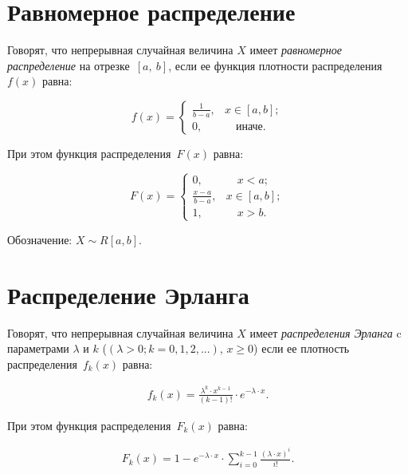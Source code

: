 
\chapter{Равномерное распределение}

Говорят, что непрерывная случайная величина $X$ имеет \textit{равномерное распределение} на отрезке~$[a,~b]$, если ее функция плотности распределения~$f(x)$ равна:

\begin{equation}
	f(x) =
	\begin{cases}
		\displaystyle\frac{1}{b - a}, & x \in [a, b];\\
		0,  & \quad \text{иначе}.
	\end{cases}
\end{equation}

При этом функция распределения~$F(x)$ равна:

\begin{equation}
	F(x) =
	\begin{cases}
		0,  & \quad x < a;\\
		\displaystyle\frac{x - a}{b - a}, & x \in [a, b];\\
		1,  & \quad x > b.
	\end{cases}
\end{equation}

Обозначение: $X \sim R[a, b]$.

\chapter{Распределение Эрланга} %

Говорят, что непрерывная случайная величина $X$ имеет \textit{распределения Эрланга} c параметрами $\lambda$ и $k$ ($(\lambda > 0; k = 0, 1, 2, ...)$, $x \geqslant 0$) если ее плотность распределения~$f_k(x)$ равна:

\begin{equation}
	\begin{aligned}
		f_k(x) = \frac{\lambda^{k} \cdot x^{k-1}}{(k-1)!} \cdot e^{-\lambda \cdot x}.
	\end{aligned}
\end{equation}

При этом функция распределения~$F_k(x)$ равна:

\begin{equation}
	\begin{aligned}
		F_k(x) = 1 - e^{-\lambda \cdot x} \cdot \sum_{i = 0}^{k-1} \frac{(\lambda \cdot x)^i}{i!}.
	\end{aligned}
\end{equation}

